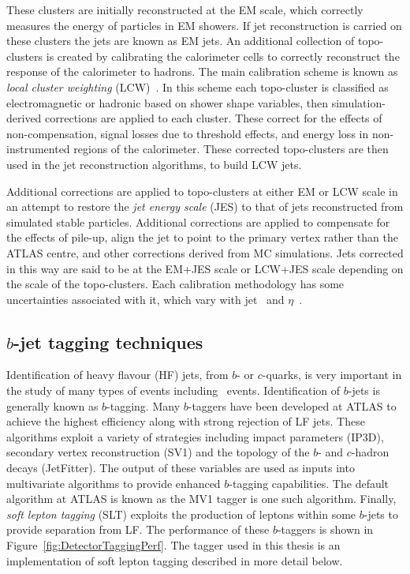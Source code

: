 These clusters are initially reconstructed at the EM scale, which correctly measures the energy of particles in EM showers. If jet reconstruction is carried on these clusters the jets are known as EM jets. An additional collection of topo-clusters is created by calibrating the calorimeter cells to correctly reconstruct the response of the calorimeter to hadrons. The main calibration scheme is known as \emph{local cluster weighting} (LCW)~\cite{Detector:JetEnergyMeasurement}. In this scheme each topo-cluster is classified as electromagnetic or hadronic based on shower shape variables, then simulation-derived corrections are applied to each cluster. These correct for the effects of non-compensation, signal losses due to threshold effects, and energy loss in non-instrumented regions of the calorimeter. These corrected topo-clusters are then used in the jet reconstruction algorithms, to build LCW jets. 

Additional corrections are applied to topo-clusters at either EM or LCW scale in an attempt to restore the \emph{jet energy scale} (JES) to that of jets reconstructed from simulated stable particles. Additional corrections are applied to compensate for the effects of pile-up, align the jet to point to the primary vertex rather than the ATLAS centre, and other corrections derived from MC simulations. Jets corrected in this way are said to be at the EM+JES scale or LCW+JES scale depending on the scale of the topo-clusters. Each calibration methodology has some uncertainties associated with it, which vary with jet \pt\ and $\eta$~\cite{Detector:JESPaper}.

\subsection{\texorpdfstring{$b$}{b}-jet tagging techniques}

Identification of heavy flavour (HF) jets, from $b$- or $c$-quarks, is very important in the study of many types of events including \ttbar\ events. Identification of $b$-jets is generally known as $b$-tagging. Many $b$-taggers have been developed at ATLAS to achieve the highest efficiency along with strong rejection of LF jets. These algorithms exploit a variety of strategies including impact parameters (IP3D), secondary vertex reconstruction (SV1) and the topology of the $b$- and $c$-hadron decays (JetFitter). The output of these variables are used as inputs into multivariate algorithms to provide enhanced $b$-tagging capabilities. The default algorithm at ATLAS is known as the MV1 tagger is one such algorithm. Finally, \emph{soft lepton tagging} (SLT) exploits the production of leptons within some $b$-jets to provide separation from LF. The performance of these $b$-taggers is shown in Figure~\ref{fig:DetectorTaggingPerf}. The tagger used in this thesis is an implementation of soft lepton tagging described in more detail below.

